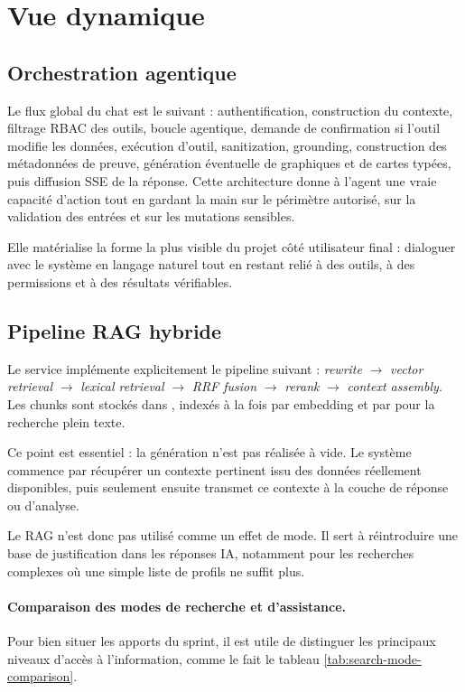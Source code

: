 \section{Vue dynamique}

\subsection{Orchestration agentique}
Le flux global du chat est le suivant : authentification, construction du contexte, filtrage RBAC des outils, boucle agentique, demande de confirmation si l'outil modifie les données, exécution d'outil, sanitization, grounding, construction des métadonnées de preuve, génération éventuelle de graphiques et de cartes typées, puis diffusion SSE de la réponse. Cette architecture donne à l'agent une vraie capacité d'action tout en gardant la main sur le périmètre autorisé, sur la validation des entrées et sur les mutations sensibles.

Elle matérialise la forme la plus visible du projet côté utilisateur final : dialoguer avec le système en langage naturel tout en restant relié à des outils, à des permissions et à des résultats vérifiables.

\subsection{Pipeline RAG hybride}
Le service  implémente explicitement le pipeline suivant : \textit{rewrite} $\rightarrow$ \textit{vector retrieval} $\rightarrow$ \textit{lexical retrieval} $\rightarrow$ \textit{RRF fusion} $\rightarrow$ \textit{rerank} $\rightarrow$ \textit{context assembly}. Les chunks sont stockés dans , indexés à la fois par embedding et par  pour la recherche plein texte.

Ce point est essentiel : la génération n'est pas réalisée à vide. Le système commence par récupérer un contexte pertinent issu des données réellement disponibles, puis seulement ensuite transmet ce contexte à la couche de réponse ou d'analyse.

Le RAG n'est donc pas utilisé comme un effet de mode. Il sert à réintroduire une base de justification dans les réponses IA, notamment pour les recherches complexes où une simple liste de profils ne suffit plus.
\paragraph{Comparaison des modes de recherche et d'assistance.}
Pour bien situer les apports du sprint, il est utile de distinguer les principaux niveaux d'accès à l'information, comme le fait le tableau \ref{tab:search-mode-comparison}.

